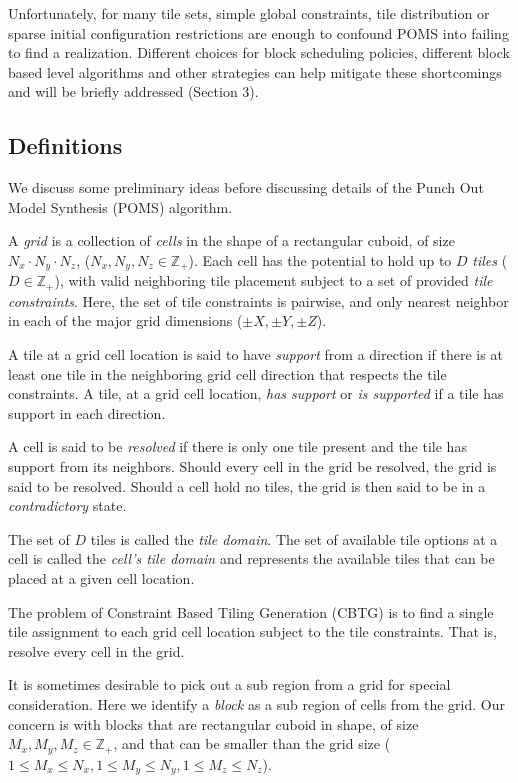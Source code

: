 Unfortunately, for many tile sets, simple global constraints, tile distribution or sparse initial configuration restrictions
are enough to
confound POMS into failing to find a realization.
Different choices for block scheduling policies, 
different block based level algorithms and other strategies
can help mitigate these shortcomings and will be briefly addressed (Section 3).


\subsection{Definitions}

We discuss some preliminary ideas before discussing details
of the Punch Out Model Synthesis (POMS) algorithm.

A \textit{grid} is a collection of \textit{cells} in the shape of a rectangular cuboid,
of size $N_x \cdot N_y \cdot N_z$, ($N_x, N_y, N_z \in \mathbb{Z}_{+}$).
Each cell has the potential to hold up to $D$ \textit{tiles} ($D \in \mathbb{Z}_+$), with valid neighboring tile placement
subject to a set of provided \textit{tile constraints}.
Here, the set of tile constraints is pairwise, and only nearest neighbor in each of the major grid dimensions ($\pm X, \pm Y, \pm Z$).

A tile at a grid cell location is said to have \textit{support} from a direction if there is at least
one tile in the neighboring grid cell direction that respects the tile constraints.
A tile, at a grid cell location, \textit{has support} or \textit{is supported} if a tile has support in each direction.

A cell is said to be \textit{resolved} if there is only one tile present and the tile has support from its neighbors.
Should every cell in the grid be resolved, the grid is said to be resolved.
Should a cell hold no tiles, the grid is then said to be in a \textit{contradictory} state.

The set of $D$ tiles is called the \textit{tile domain}.
The set of available tile options at a cell is called the \textit{cell's tile domain} and represents the
available tiles that can be placed at a given cell location.


The problem of Constraint Based Tiling Generation (CBTG) is to
find a single tile assignment to each grid cell location subject to the tile constraints.
That is, resolve every cell in the grid.

It is sometimes desirable to pick out a sub region from a grid for special consideration.
Here we identify a \textit{block} as a sub region of cells from the grid.
Our concern is with blocks that are rectangular cuboid in shape,
of size $M_x, M_y, M_z \in \mathbb{Z}_+$,
and that can be smaller than the grid size ($1 \le M_x \le N_x, 1 \le M_y \le N_y, 1 \le M_z \le N_z$).

